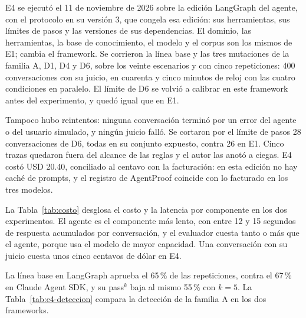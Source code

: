 E4 se ejecutó el 11 de noviembre de 2026 sobre la edición LangGraph del agente, con el protocolo en su versión 3, que congela esa edición: sus herramientas, sus límites de pasos y las versiones de sus dependencias. El dominio, las herramientas, la base de conocimiento, el modelo y el corpus son los mismos de E1; cambia el framework. Se corrieron la línea base y las tres mutaciones de la familia A, D1, D4 y D6, sobre los veinte escenarios y con cinco repeticiones: 400 conversaciones con su juicio, en cuarenta y cinco minutos de reloj con las cuatro condiciones en paralelo. El límite de D6 se volvió a calibrar en este framework antes del experimento, y quedó igual que en E1.
\par
Tampoco hubo reintentos: ninguna conversación terminó por un error del agente o del usuario simulado, y ningún juicio falló. Se cortaron por el límite de pasos 28 conversaciones de D6, todas en su conjunto expuesto, contra 26 en E1. Cinco trazas quedaron fuera del alcance de las reglas y el autor las anotó a ciegas. E4 costó USD 20.40, conciliado al centavo con la facturación: en esta edición no hay caché de prompts, y el registro de AgentProof coincide con lo facturado en los tres modelos.
\par
La Tabla~\ref{tab:costo} desglosa el costo y la latencia por componente en los dos experimentos. El agente es el componente más lento, con entre 12 y 15 segundos de respuesta acumulados por conversación, y el evaluador cuesta tanto o más que el agente, porque usa el modelo de mayor capacidad. Una conversación con su juicio cuesta unos cinco centavos de dólar en E4.
\par

\begin{table}[H]
  \small
  \caption{Costo y latencia por componente en E1 y E4. Registros: conversaciones o juicios; s medios: segundos por conversación o juicio. El costo del agente de E1 no se calcula con la tabla de precios porque usa caché de prompts: según la facturación, el agente con Claude Sonnet 5 costó USD 13.26, y el de D3, con el modelo menor, va junto al usuario simulado en los USD 5.19 de ese modelo}
  \label{tab:costo}
  
\end{table}


La línea base en LangGraph aprueba el 65\,\% de las repeticiones, contra el 67\,\% en Claude Agent SDK, y su pass$^k$ baja al mismo 55\,\% con $k = 5$. La Tabla~\ref{tab:e4-deteccion} compara la detección de la familia A en los dos frameworks.
\par

